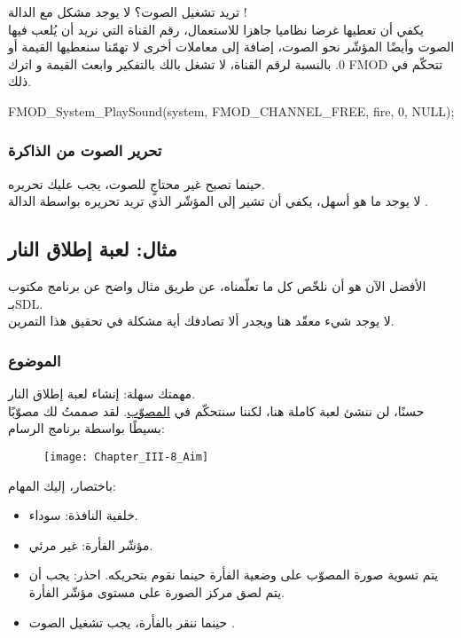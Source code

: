 تريد تشغيل الصوت؟ لا يوجد مشكل مع الدالة
!\\
يكفي أن تعطيها غرضا نظاميا جاهزا للاستعمال، رقم القناة التي نريد أن يُلعب فيها الصوت وأيضًا المؤشّر نحو الصوت، إضافة إلى معاملات أخرى لا تهمّنا سنعطيها القيمة
أو 0. بالنسبة لرقم القناة، لا تشغل بالك بالتفكير وابعث القيمة
و اترك
\textenglish{FMOD}
تتحكّم في ذلك.

\begin{Csource}
FMOD_System_PlaySound(system, FMOD_CHANNEL_FREE, fire, 0, NULL);
\end{Csource}

\subsubsection{تحرير الصوت من الذاكرة}

حينما تصبح غير محتاجٍ للصوت، يجب عليك تحريره. \\
لا يوجد ما هو أسهل، يكفي أن تشير إلى المؤشّر الذي تريد تحريره بواسطة الدالة
.


\subsection{مثال: لعبة إطلاق النار}

الأفضل الآن هو أن نلخّص كل ما تعلّمناه، عن طريق مثال واضح عن برنامج مكتوب بـ\textenglish{SDL}.\\
لا يوجد شيء معقّد هنا ويجدر ألا تصادفك أية مشكلة في تحقيق هذا التمرين.

\subsubsection{الموضوع}

مهمتك سهلة: إنشاء لعبة إطلاق النار.\\
حسنًا، لن ننشئ لعبة كاملة هنا، لكننا سنتحكّم في
\underline{المصوّب}.
 لقد صممتُ لك مصوّبًا بسيطًا بواسطة برنامج الرسام:

\begin{figure}[H]
	\centering
	\texttt{[image: Chapter\_III-8\_Aim]}
\end{figure}

باختصار، إليك المهام:

\begin{itemize}
	\item خلفية النافذة: سوداء.
	\item مؤشّر الفأرة: غير مرئي.
	\item يتم تسوية صورة المصوّب على وضعية الفأرة حينما نقوم بتحريكه. احذر: يجب أن يتم لصق مركز الصورة على مستوى مؤشّر الفأرة.
	\item حينما ننقر بالفأرة، يجب تشغيل الصوت
	.
\end{itemize}

